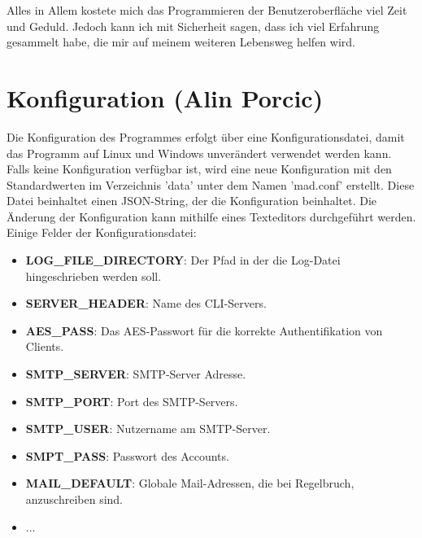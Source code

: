 \documentclass[12pt,a4paper]{report}
\begin{document}
\begin{onehalfspace}
Alles in Allem kostete mich das Programmieren der Benutzeroberfläche viel Zeit und Geduld. Jedoch kann ich mit Sicherheit sagen, dass ich viel Erfahrung gesammelt habe, die mir auf meinem weiteren Lebensweg helfen wird.

\chapter{Konfiguration (Alin Porcic)}

Die Konfiguration des Programmes erfolgt über eine Konfigurationsdatei, damit das Programm auf Linux und Windows unverändert verwendet werden kann. Falls keine Konfiguration verfügbar ist, wird eine neue Konfiguration mit den Standardwerten im Verzeichnis 'data' unter dem Namen 'mad.conf' erstellt. Diese Datei beinhaltet einen JSON-String, der die Konfiguration beinhaltet. Die Änderung der Konfiguration kann mithilfe eines Texteditors durchgeführt werden. Einige Felder der Konfigurationsdatei:

\begin{itemize}
\item \textbf{LOG\_FILE\_DIRECTORY}: Der Pfad in der die Log-Datei hingeschrieben werden soll.
\item \textbf{SERVER\_HEADER}: Name des CLI-Servers.
\item \textbf{AES\_PASS}: Das AES-Passwort für die korrekte Authentifikation von Clients.
\item \textbf{SMTP\_SERVER}: SMTP-Server Adresse.
\item \textbf{SMTP\_PORT}: Port des SMTP-Servers.
\item \textbf{SMTP\_USER}: Nutzername am SMTP-Server.
\item \textbf{SMPT\_PASS}: Passwort des Accounts.
\item \textbf{MAIL\_DEFAULT}: Globale Mail-Adressen, die bei Regelbruch, anzuschreiben sind.
\item ...
\end{itemize}


\end{onehalfspace}
\end{document}
